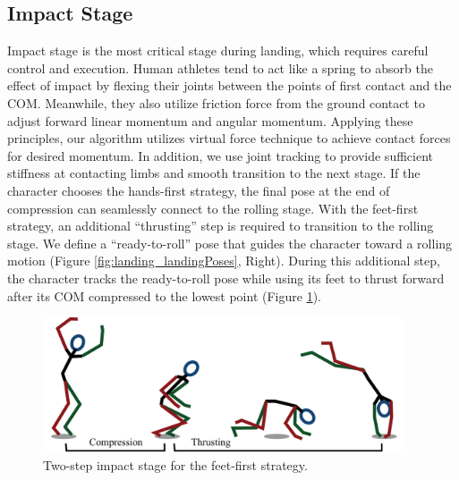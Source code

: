 \subsection{Impact Stage}
\label{sec:landing_impact}


Impact stage is the most critical stage during landing, which requires
careful control and execution. Human athletes tend to act like a
spring to absorb the effect of impact by flexing their joints between
the points of first contact and the COM. Meanwhile, they also utilize
friction force from the ground contact to adjust forward linear
momentum and angular momentum. Applying these principles, our
algorithm utilizes virtual force technique to achieve contact forces
for desired momentum. In addition, we use joint tracking to provide
sufficient stiffness at contacting limbs and smooth transition to the
next stage. If the character chooses the hands-first strategy, the
final pose at the end of compression can seamlessly connect to the
rolling stage. With the feet-first strategy, an additional
``thrusting'' step is required to transition to the rolling stage. We
define a ``ready-to-roll'' pose that guides the character toward a
rolling motion (Figure \ref{fig:landing_landingPoses}, Right). During this additional
step, the character tracks the ready-to-roll pose while using its feet
to thrust forward after its COM compressed to the lowest point (Figure
\ref{fig:landing_feet-first}).

\begin{figure}[htbp]
\center
\includegraphics[width=4.2in]{images/feet-first}
\caption{Two-step impact stage for the feet-first strategy.}
\label{fig:landing_feet-first}
\end{figure}

